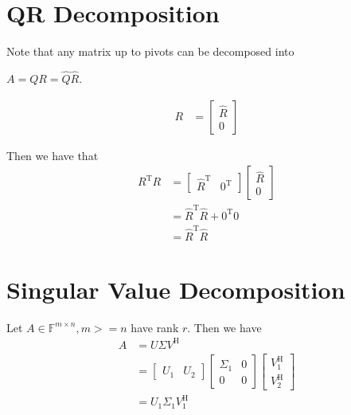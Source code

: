 \documentclass{article}
\begin{document}
\section{QR Decomposition}

Note that any matrix up to pivots can be decomposed into 

$A = QR = \hat{Q} \hat{R}$.

\begin{align*}
    R &= \begin{bmatrix}
        \hat{R} \\
        0
    \end{bmatrix}
\end{align*}

Then we have that
\begin{align*}
    R^\mathrm{T} R &= \begin{bmatrix}
        \hat{R}^\mathrm{T} & 0^\mathrm{T}
    \end{bmatrix} \begin{bmatrix}
        \hat{R} \\
        0
    \end{bmatrix} \\
    &= \hat{R}^\mathrm{T} \hat{R} + 0^\mathrm{T} 0 \\
    &= \hat{R}^\mathrm{T} \hat{R}
\end{align*}

\section{Singular Value Decomposition}

Let $A \in \mathbb{F}^{m \times n}, m >= n$ have rank $r$.
Then we have
\begin{align*}
    A &= U \Sigma V^\mathrm{H} \\
    &= \begin{bmatrix}
        U_1 & U_2
    \end{bmatrix} \begin{bmatrix}
        \Sigma_1 & 0 \\
        0 & 0
    \end{bmatrix} \begin{bmatrix}
        V_1^\mathrm{H} \\
        V_2^\mathrm{H}
    \end{bmatrix} \\
    &= U_1 \Sigma_1 V_1^\mathrm{H}
\end{align*}
\end{document}
